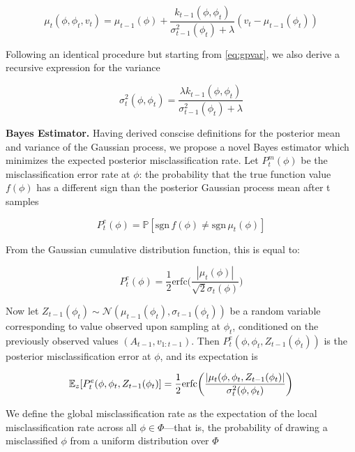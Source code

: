 \documentclass[letterpaper, 10 pt, conference]{ieeeconf}  %
\begin{document}
\begin{equation}
    \mu_t(\phi,\phi_t,v_t) = \mu_{t-1}(\phi) + \frac{k_{t-1}(\phi,\phi_t)}{\sigma_{t-1}^2(\phi_t)+\lambda}(v_t-\mu_{t-1}(\phi_t))
    \label{eq:recmu}
\end{equation}

Following an identical procedure but starting from \eqref{eq:gpvar}, we also derive a recursive expression for the variance

\begin{equation}
    \sigma_t^2(\phi,\phi_t) = \frac{\lambda k_{t-1}(\phi,\phi_t)}{\sigma_{t-1}^2(\phi_t)+\lambda}
    \label{eq:recsig}
\end{equation}
\smallskip

\noindent\textbf{Bayes Estimator.} Having derived conscise definitions for the posterior mean and variance of the Gaussian process, we propose a novel Bayes estimator which minimizes the expected posterior misclassification rate. Let $P^m_t(\phi)$ be the misclassification error rate at $\phi$: the probability that the true function value $f(\phi)$ has a different sign than the posterior Gaussian process mean after t samples


\begin{equation}
    P^e_t (\phi) = \mathbb{P}[\text{sgn}\,f(\phi)\neq \text{sgn}\,\mu_t(\phi)]
\end{equation}

From the Gaussian cumulative distribution function, this is equal to:

\begin{equation}
    P^e_t(\phi) = \frac{1}{2}\text{erfc}\bigg(\frac{|\mu_t(\phi)|}{\sqrt{2}\sigma_t(\phi)}\bigg)
\end{equation}
\smallskip

Now let $Z_{t-1}(\phi_t)\sim\mathcal{N}(\mu_{t-1}(\phi_t),\sigma_{t-1}(\phi_t))$ be a random variable corresponding to value observed upon sampling at $\phi_t$, conditioned on the previously observed values $(A_{t-1},v_{1:t-1})$. Then $P_t^e(\phi,\phi_t,Z_{t-1}(\phi_t))$ is the posterior misclassification error at $\phi$, and its expectation is

\begin{equation}
    \small
    \mathbb{E}_{z}[P_t^e(\phi,\phi_t,Z_{t-1}(\phi_t)] = \frac{1}{2}\text{erfc}\bigg(\frac{|\mu_t(\phi,\phi_t,Z_{t-1}(\phi_t)|}{\sigma_t^2(\phi,\phi_t)}\bigg)
    \label{eq:exprec}
\end{equation}
\smallskip

We define the global misclassification rate as the expectation of the local misclassification rate across all $\phi\in\Phi$---that is, the probability of drawing a misclassified $\phi$ from a uniform distribution over $\Phi$
\end{document}
